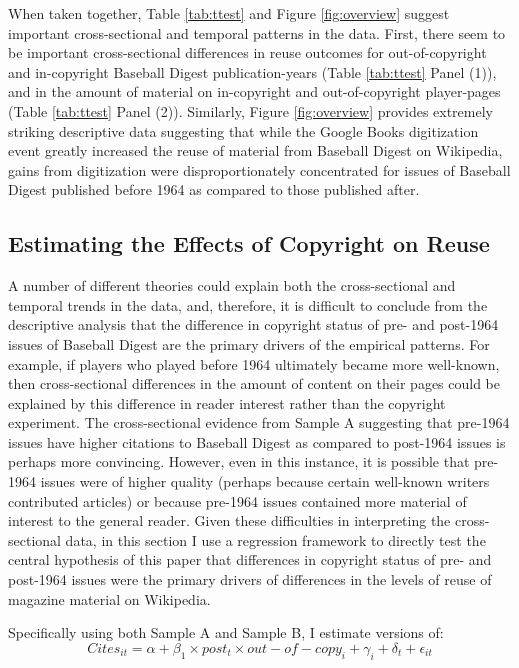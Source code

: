 \documentclass[11pt]{article}
\begin{document}
When taken together, Table \ref{tab:ttest} and Figure \ref{fig:overview} suggest important cross-sectional and temporal patterns in the data. First, there seem to be important cross-sectional differences in reuse outcomes for out-of-copyright and in-copyright Baseball Digest publication-years (Table \ref{tab:ttest} Panel (1)), and in the amount of material on in-copyright and out-of-copyright player-pages (Table \ref{tab:ttest} Panel (2)). Similarly, Figure \ref{fig:overview} provides extremely striking descriptive data suggesting that while the Google Books digitization event greatly increased the reuse of material from Baseball Digest on Wikipedia, gains from digitization were disproportionately concentrated for issues of Baseball Digest published before 1964 as compared to those published after. 

\subsection{Estimating the Effects of Copyright on Reuse}
\label{sec:maindd}

A number of different theories could explain both the cross-sectional and temporal trends in the data, and, therefore, it is difficult to conclude from the descriptive analysis that the difference in copyright status of pre- and post-1964 issues of Baseball Digest are the primary drivers of the empirical patterns. For example, if players who played before 1964 ultimately became more well-known, then cross-sectional differences in the amount of content on their pages could be explained by this difference in reader interest rather than the copyright experiment. The cross-sectional evidence from Sample A suggesting that pre-1964 issues have higher citations to Baseball Digest as compared to post-1964 issues is perhaps more convincing. However, even in this instance, it is possible that pre-1964 issues were of higher quality (perhaps because certain well-known writers contributed articles) or because pre-1964 issues contained more material of interest to the general reader. Given these difficulties in interpreting the cross-sectional data, in this section I use a regression framework to directly test the central hypothesis of this paper that differences in copyright status of pre- and post-1964 issues were the primary drivers of differences in the levels of reuse of magazine material on Wikipedia.  

Specifically using both Sample A and Sample B, I estimate versions of: $$Cites_{it} = \alpha + \beta_1 \times post_t \times out-of-copy_i + \gamma_i+ \delta_t + \epsilon_{it}$$ 
\end{document}
